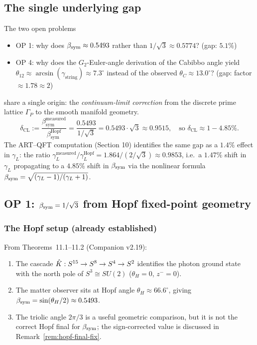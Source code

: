 \subsection{The single underlying gap}

\begin{remark}
The two open problems
\begin{itemize}
\item OP 1: why does $\beta_{\mathrm{sym}} \approx 0.5493$ rather than $1/\sqrt{3}
 \approx 0.5774$? (gap: $5.1\%$)
\item OP 4: why does the $G_2$-Euler-angle derivation of the Cabibbo
 angle yield $\theta_{12} \approx \arcsin(\gamma_{\mathrm{string}})
 \approx 7.3^\circ$ instead of the observed $\theta_C \approx 13.0^\circ$?
 (gap: factor $\approx 1.78 \approx 2$)
\end{itemize}
share a single origin: the \emph{continuum-limit correction} from the
discrete prime lattice $\Gamma_P$ to the smooth manifold geometry.
\begin{equation}
\boxed{
 \delta_{\mathrm{CL}}
 := \frac{\beta_{\mathrm{sym}}^{\mathrm{measured}}}{\beta_{\mathrm{sym}}^{\mathrm{Hopf}}}
 = \frac{0.5493}{1/\sqrt{3}}
 = 0.5493 \cdot \sqrt{3}
 \approx 0.9515,
 \quad
 \text{so } \delta_{\mathrm{CL}} \approx 1 - 4.85\%.
}
\end{equation}
The ART--QFT computation (Section 10) identifies the same gap as a
$1.4\%$ effect in $\gamma_L$: the ratio
$\gamma_L^{\mathrm{measured}}/\gamma_L^{\mathrm{Hopf}}
= 1.864 / (2/\sqrt{3}) \approx 0.9853$,
i.e.\ a $1.47\%$ shift in $\gamma_L$ propagating to a $4.85\%$ shift
in $\beta_{\mathrm{sym}}$ via the nonlinear formula
$\beta_{\mathrm{sym}} = \sqrt{(\gamma_L-1)/(\gamma_L+1)}$.
\end{remark}

\subsection{OP 1: \texorpdfstring{$\beta_{\mathrm{sym}} = 1/\sqrt{3}$}{β\_sym = 1/√3}
 from Hopf fixed-point geometry}
\label{sec:op1}

\subsubsection{The Hopf setup (already established)}

From Theorems~11.1--11.2 (Companion v2.19):
\begin{enumerate}
\item The cascade $\hat{K}: S^{15} \to S^8 \to S^4 \to S^2$ identifies
 the photon ground state with the north pole of $S^3 \cong SU(2)$
 ($\theta_H = 0$, $z^- = 0$).
\item The matter observer sits at Hopf angle $\theta_H \approx 66.6^\circ$,
 giving $\beta_{\mathrm{sym}} = \sin(\theta_H/2) \approx 0.5493$.
\item The triolic angle $2\pi/3$ is a useful geometric comparison, but it
 is not the correct Hopf final for $\beta_{\mathrm{sym}}$; the sign-corrected value
 is discussed in Remark~\ref{rem:hopf-final-fix}.
\end{enumerate}

